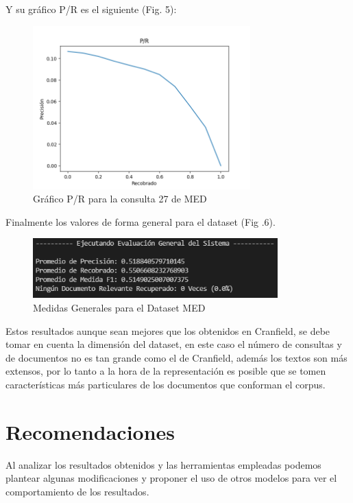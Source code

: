 \documentclass[runningheads,a4paper]{llncs}
\begin{document}
Y su gráfico P/R es el siguiente (Fig. 5):

\begin{figure}
	\centering
	\includegraphics[height=6.3cm]{imgs/pr_query27_med.png}
	\caption{Gráfico P/R para la consulta 27 de MED}
	\label{fig:med1pr}
\end{figure}

Finalmente los valores de forma general para el dataset (Fig .6). 

\begin{figure}
	\centering
	\includegraphics[height=2.3cm]{imgs/eval_general_med.png}
	\caption{Medidas Generales para el Dataset MED}
	\label{fig:med1gen}
\end{figure}

Estos resultados aunque sean mejores que los obtenidos en Cranfield, se debe tomar en cuenta la dimensión del dataset, en este caso el número de consultas y de documentos no es tan grande como el de Cranfield, además los textos son más extensos, por lo tanto a la hora de la representación es posible que se tomen características más particulares de los documentos que conforman el corpus. 


\section{Recomendaciones}

Al analizar los resultados obtenidos y las herramientas empleadas podemos plantear algunas modificaciones y proponer el uso de otros modelos para ver el comportamiento de los resultados.
\end{document}
